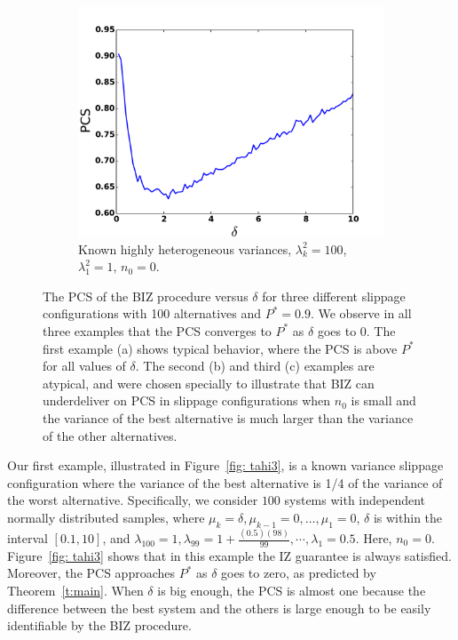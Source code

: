 \documentclass{wscpaperproc}
\theoremstyle{wsc}
\begin{document}
\begin{figure}[h]
        \hfill
    \begin{subfigure}[b]{0.3\textwidth}
        \centering
         \includegraphics[width=\textwidth]{plot3.pdf}
    \caption{ 
    Known highly heterogeneous variances, 
    $\lambda^2_{k} = 100$, $\lambda_{1}^2 = 1$, $n_0=0$.
        \label{fig: tahi}}
    \end{subfigure}
\caption{
    The PCS of the BIZ procedure versus $\delta$ for three different slippage configurations with 100 alternatives and $P^*=0.9$.
    We observe in all three examples that the PCS converges to $P^*$ as $\delta$ goes to $0$.
    The first example (a) shows typical behavior, where the PCS is above $P^*$ for all values of $\delta$.
    The second (b) and third (c) examples are atypical, and were chosen specially to illustrate that BIZ can underdeliver on PCS in slippage configurations when $n_0$ is small and the variance of the best alternative is much larger than the variance of the other alternatives.
\label{fig:tahi10}}
\end{figure}  

Our first example, illustrated in Figure~\ref{fig: tahi3}, is a known variance slippage configuration where the variance of the best alternative is 1/4 of the variance of the worst alternative. Specifically, we consider $100$ systems with independent normally distributed samples, where $\mu_{k}=\delta,\mu_{k-1}=0,\dots,\mu_{1}=0$, $\delta$ is within the interval $[0.1,10]$, and $\lambda_{100}=1,\lambda_{99}=1+\frac{(0.5)(98)}{99},\cdots,\lambda_{1}=0.5$. Here, $n_{0}=0$. Figure~\ref{fig: tahi3} shows that in this example the IZ guarantee is always satisfied.  Moreover, the PCS approaches $P^*$ as $\delta$ goes to zero, as predicted by Theorem~\ref{t:main}. When $\delta$ is big enough, the PCS is almost one because the difference between the best system and the others is large enough to be easily identifiable by the BIZ procedure. 
\end{document}
